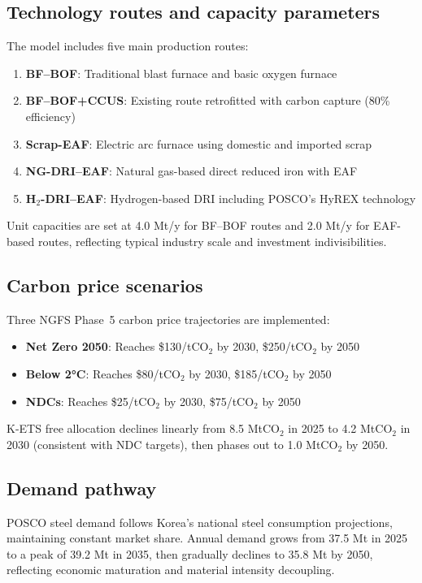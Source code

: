 \documentclass[preprint,5p,authoryear]{elsarticle}
\begin{document}
\subsection{Technology routes and capacity parameters}
The model includes five main production routes:
\begin{enumerate}
  \item \textbf{BF--BOF}: Traditional blast furnace and basic oxygen furnace
  \item \textbf{BF--BOF+CCUS}: Existing route retrofitted with carbon capture (80\% efficiency)
  \item \textbf{Scrap-EAF}: Electric arc furnace using domestic and imported scrap
  \item \textbf{NG-DRI--EAF}: Natural gas-based direct reduced iron with EAF
  \item \textbf{H$_2$-DRI--EAF}: Hydrogen-based DRI including POSCO's HyREX technology
\end{enumerate}

Unit capacities are set at 4.0 Mt/y for BF--BOF routes and 2.0 Mt/y for EAF-based routes, reflecting typical industry scale and investment indivisibilities.

\subsection{Carbon price scenarios}
Three NGFS Phase~5 carbon price trajectories are implemented:
\begin{itemize}
  \item \textbf{Net Zero 2050}: Reaches \$130/tCO$_2$ by 2030, \$250/tCO$_2$ by 2050
  \item \textbf{Below 2°C}: Reaches \$80/tCO$_2$ by 2030, \$185/tCO$_2$ by 2050
  \item \textbf{NDCs}: Reaches \$25/tCO$_2$ by 2030, \$75/tCO$_2$ by 2050
\end{itemize}

K-ETS free allocation declines linearly from 8.5 MtCO$_2$ in 2025 to 4.2 MtCO$_2$ in 2030 (consistent with NDC targets), then phases out to 1.0 MtCO$_2$ by 2050.

\subsection{Demand pathway}
POSCO steel demand follows Korea's national steel consumption projections, maintaining constant market share. Annual demand grows from 37.5 Mt in 2025 to a peak of 39.2 Mt in 2035, then gradually declines to 35.8 Mt by 2050, reflecting economic maturation and material intensity decoupling.
\end{document}
